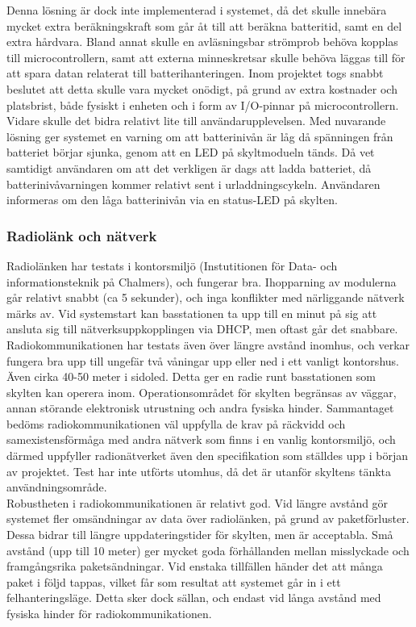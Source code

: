 \documentclass[a4paper,11pt]{article}
\begin{document}
Denna lösning är dock inte implementerad i systemet, då det skulle innebära mycket extra beräkningskraft som går åt till att beräkna batteritid, samt en del extra hårdvara. Bland annat skulle en avläsningsbar strömprob behöva kopplas till microcontrollern, samt att externa minneskretsar skulle behöva läggas till för att spara datan relaterat till batterihanteringen. Inom projektet togs snabbt beslutet att detta skulle vara mycket onödigt, på grund av extra kostnader och platsbrist, både fysiskt i enheten och i form av I/O-pinnar på microcontrollern. Vidare skulle det bidra relativt lite till användarupplevelsen. Med nuvarande lösning ger systemet en varning om att batterinivån är låg då spänningen från batteriet börjar sjunka, genom att en LED på skyltmodueln tänds. Då vet samtidigt användaren om att det verkligen är dags att ladda batteriet, då batterinivåvarningen kommer relativt sent i urladdningscykeln. Användaren informeras om den låga batterinivån via en status-LED på skylten. \\

\subsubsection{Radiolänk och nätverk}
Radiolänken har testats i kontorsmiljö (Instutitionen för Data- och informationsteknik på Chalmers), och fungerar bra. Ihopparning av modulerna går relativt snabbt (ca 5 sekunder), och inga konflikter med närliggande nätverk märks av. Vid systemstart kan basstationen ta upp till en minut på sig att ansluta sig till nätverksuppkopplingen via DHCP, men oftast går det snabbare. \\

Radiokommunikationen har testats även över längre avstånd inomhus, och verkar fungera bra upp till ungefär två våningar upp eller ned i ett vanligt kontorshus. Även cirka 40-50 meter i sidoled. Detta ger en radie runt basstationen som skylten kan operera inom. Operationsområdet för skylten begränsas av väggar, annan störande elektronisk utrustning och andra fysiska hinder. Sammantaget bedöms radiokommunikationen väl uppfylla de krav på räckvidd och samexistensförmåga med andra nätverk som finns i en vanlig kontorsmiljö, och därmed uppfyller radionätverket även den specifikation som ställdes upp i början av projektet. Test har inte utförts utomhus, då det är utanför skyltens tänkta användningsområde. \\

Robustheten i radiokommunikationen är relativt god. Vid längre avstånd gör systemet fler omsändningar av data över radiolänken, på grund av paketförluster. Dessa bidrar till längre uppdateringstider för skylten, men är acceptabla. Små avstånd (upp till 10 meter) ger mycket goda förhållanden mellan misslyckade och framgångsrika paketsändningar. Vid enstaka tillfällen händer det att många paket i följd tappas, vilket får som resultat att systemet går in i ett felhanteringsläge. Detta sker dock sällan, och endast vid långa avstånd med fysiska hinder för radiokommunikationen.
\end{document}
